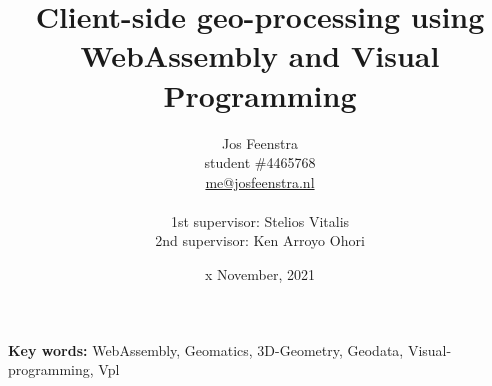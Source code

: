 \documentclass[a4paper,11pt]{scrartcl}
\title{Client-side geo-processing using WebAssembly and Visual Programming}
\author{
  Jos Feenstra\\
  student \#4465768 \\
  \url{me@josfeenstra.nl}\\
  \\
  1st supervisor: Stelios Vitalis \\
  2nd supervisor: Ken Arroyo Ohori \\
}
\date{x November, 2021}
\begin{document}
\clearpage\maketitle
\thispagestyle{empty}

\begin{center}
  \textbf{Key words:} WebAssembly, Geomatics, 3D-Geometry, Geodata, Visual-programming, Vpl 
\end{center}

\newpage


\newpage
\printbibliography
\end{document}

